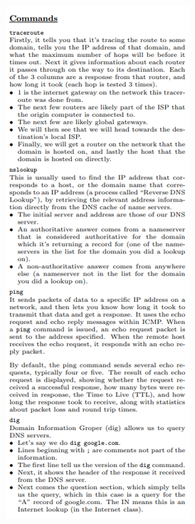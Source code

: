 \documentclass[12pt, landscape]{article}
\begin{document}
\begin{multicols*}{3}
\centerline{\includegraphics[width=0.85\linewidth]{command1}}

\end{multicols*}
\end{document}
